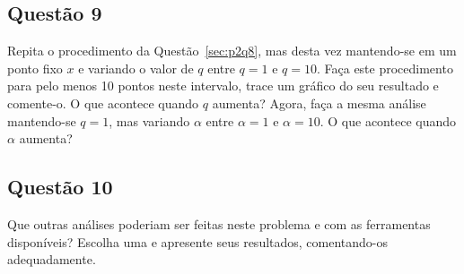 \documentclass[12pt]{article}
\begin{document}
\subsection*{Questão 9}
\label{sec:p2q9}
Repita o procedimento da Questão~\ref{sec:p2q8}, mas desta vez mantendo-se em um ponto fixo $x$ e variando o valor de $q$ entre $q = 1$ e $q = 10$. Faça este procedimento para pelo menos 10 pontos neste intervalo, trace um gráfico do seu resultado e comente-o. O que acontece quando $q$ aumenta? Agora, faça a mesma análise mantendo-se $q = 1$, mas variando $\alpha$ entre $\alpha = 1$ e $\alpha = 10$. O que acontece quando $\alpha$ aumenta?

\subsection*{Questão 10}
\label{sec:p2q10}
Que outras análises poderiam ser feitas neste problema e com as ferramentas disponíveis? Escolha uma e apresente seus resultados, comentando-os adequadamente.
\end{document}
